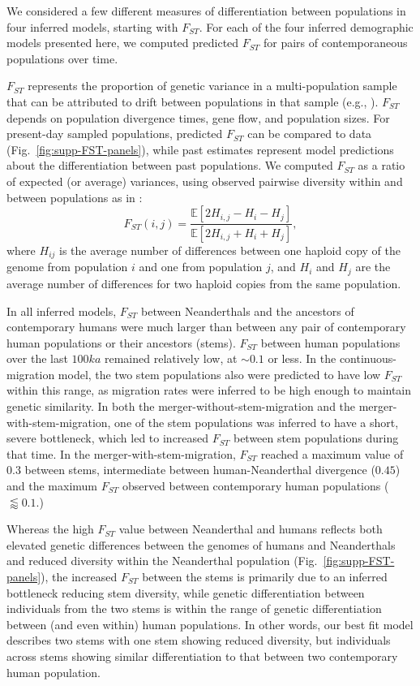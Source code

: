 \documentclass[]{article}
\newcommand{\E}{\mathbb{E}}
\begin{document}
We considered a few different measures of differentiation between populations
in four inferred models, starting with $F_{ST}.$ For each of the four inferred
demographic models presented here, we computed predicted $F_{ST}$ for pairs of
contemporaneous populations over time. 

$F_{ST}$ represents the proportion of genetic variance in a multi-population
sample that can be attributed to drift between populations in that sample
(e.g., \cite{Bhatia2013-sq}).  $F_{ST}$ depends on population divergence times,
gene flow, and population sizes. For present-day sampled populations, predicted
$F_{ST}$ can be compared to data (Fig.~\ref{fig:supp-FST-panels}), while past
estimates represent model predictions about the differentiation between past
populations. We computed $F_{ST}$ as a ratio of expected (or average)
variances, using observed pairwise diversity within and between populations as
in \citet{Peter2016-ys}:
\begin{equation}
    F_{ST}(i, j) = \frac{\E[2H_{i,j} - H_i - H_j]}{\E[2H_{i,j} + H_i + H_j]},
    \label{eq:FST}
\end{equation}
where $H_{ij}$ is the average number of differences between one haploid copy of
the genome from population $i$ and one from population $j$, and $H_i$ and $H_j$
are the average number of differences for two haploid copies from the same
population.

In all inferred models, $F_{ST}$ between Neanderthals and the
ancestors of contemporary humans were much larger than between any pair of contemporary
human populations or their ancestors (stems). $F_{ST}$ between human
populations over the last $100ka$ remained relatively low, at $\sim0.1$ or
less. In the continuous-migration model, the two stem populations also were
predicted to have low $F_{ST}$ within this range, as migration rates were
inferred to be high enough to maintain genetic similarity. In both the
merger-without-stem-migration and the merger-with-stem-migration, one of the
stem populations was inferred to have a short, severe bottleneck, which led to
increased $F_{ST}$ between stem populations during that time. In the
merger-with-stem-migration, $F_{ST}$ reached a maximum value of $0.3$ between stems,
intermediate between human-Neanderthal divergence ($0.45$)
and the maximum $F_{ST}$ observed between contemporary human populations
($\lessapprox 0.1$.) 

Whereas the high $F_{ST}$ value between Neanderthal and humans reflects both
elevated genetic differences between the genomes of humans and
Neanderthals and reduced diversity within the Neanderthal population
(Fig.~\ref{fig:supp-FST-panels}), the increased $F_{ST}$ between the stems is
primarily due to an inferred bottleneck reducing stem diversity, while genetic
differentiation between individuals from the two stems is within the range of
genetic differentiation between (and even within) human populations. In other
words, our best fit model describes two stems with one stem showing reduced
diversity, but individuals across stems showing similar differentiation to
that between two contemporary human population.
\end{document}
